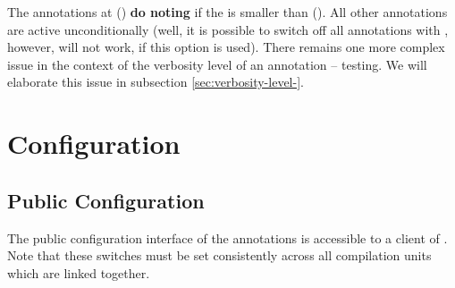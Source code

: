 %
The annotations at \AudLevel (\DebLevel) \textbf{do noting} if the
\BuildLevel is smaller than \AudLevel (\DebLevel). All other
annotations are active unconditionally (well, it is possible to switch
off all annotations with \SwitchProductionAnnotations, however,
\SYNEIGHT will not work, if this option is used). 
%
There remains one more complex issue in the context of the verbosity
level of an annotation -- testing. We will elaborate this issue in
subsection \vref{sec:verbosity-level-}.




\section{Configuration}
\label{sec:configuration}


\subsection{Public Configuration}
\label{sec:public-configuration}

The public configuration interface of the annotations is accessible to
a client of \SYNEIGHT. Note that these switches  must be set
consistently across all compilation units which are linked
together. 

